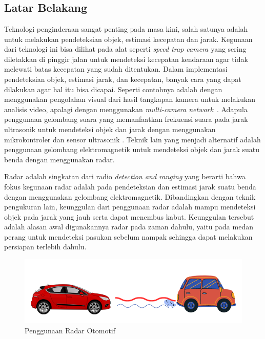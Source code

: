 \chapter{\babSatu}
\section{Latar Belakang}
Teknologi penginderaan sangat penting pada masa kini, salah satunya adalah untuk melakukan pendeteksian objek, estimasi kecepatan dan jarak. Kegunaan dari teknologi ini bisa dilihat pada alat seperti \textit{speed trap camera} yang sering diletakkan di pinggir jalan untuk mendeteksi kecepatan kendaraan agar tidak melewati batas kecepatan yang sudah ditentukan. Dalam implementasi pendeteksian objek, estimasi jarak, dan kecepatan, banyak cara yang dapat dilakukan agar hal itu bisa dicapai. Seperti contohnya adalah dengan menggunakan pengolahan visual dari hasil tangkapan kamera untuk melakukan analisis video, apalagi dengan menggunakan \textit{multi-camera network}~\cite{Zhang2015}. Adapula penggunaan gelombang suara yang memanfaatkan frekuensi suara pada jarak ultrasonik untuk mendeteksi objek dan jarak dengan menggunakan mikrokontroler dan sensor ultrasonik \cite{Biswas2020}. Teknik lain yang menjadi alternatif adalah penggunaan gelombang elektromagnetik untuk mendeteksi objek dan jarak suatu benda dengan menggunakan radar. 

Radar adalah singkatan dari radio \textit{detection and ranging} yang berarti bahwa fokus kegunaan radar adalah pada pendeteksian dan estimasi jarak suatu benda dengan menggunakan gelombang elektromagnetik. Dibandingkan dengan teknik pengukuran lain, keunggulan dari penggunaan radar adalah mampu mendeteksi 
objek pada jarak yang jauh serta dapat menembus kabut. Keunggulan tersebut adalah alasan awal digunakannya radar pada zaman dahulu, yaitu  pada medan perang untuk mendeteksi pasukan sebelum nampak sehingga dapat melakukan persiapan terlebih dahulu. 

\begin{figure}
	\begin{center}
		\includegraphics[scale=0.5]{pics/bab1/AplikasiRadar.png} 
		\caption[Penggunaan Radar Otomotif]{Penggunaan Radar Otomotif}
		\label{pic:aplikasiRadarKini}
	\end{center}
\end{figure}

